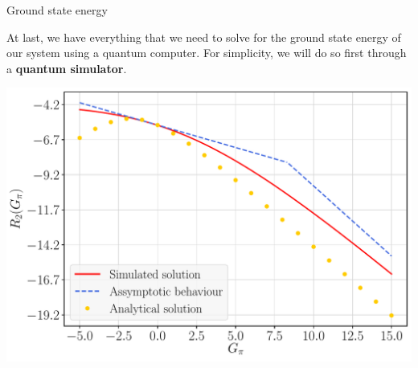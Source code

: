 \documentclass[9pt, aspectratio=169]{beamer}
\begin{document}
\begin{frame}[allowframebreaks]{Ground state energy}

	At last, we have everything that we need to solve for the ground state energy of our system using a quantum computer. For simplicity, we will do so first through a \textbf{quantum simulator}.

	\begin{center}
		\includegraphics[width=.45\paperwidth]{Figures/NJL1-model-solving/G2}
	\end{center}
	\vspace{-2em}

\break


\end{frame}
\end{document}
